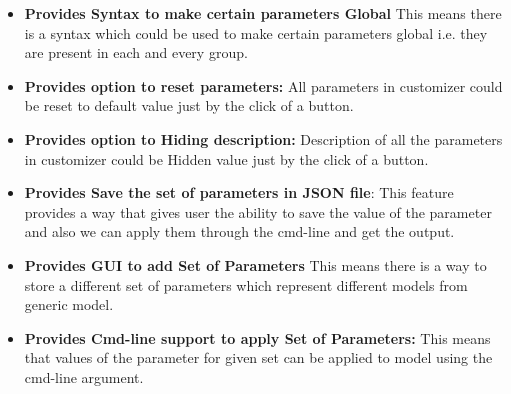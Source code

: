 \begin{itemize}
    \item \textbf{Provides Syntax to make certain parameters Global}
    This means there is a syntax which could be used to make certain parameters global i.e. they are present in each and every group.

    \item \textbf{Provides option to reset parameters:}
    All parameters in customizer could be reset to default value just by the click of a button.

    \item \textbf{Provides option to Hiding description:}
    Description of all the parameters in customizer could be Hidden value just by the click of a button.
   
    \item \textbf{Provides Save the set of parameters in JSON file}:
    This feature provides a way that gives user the ability to save the value of the parameter and also we can apply them through the cmd-line and get the output.
   
    \item \textbf{Provides GUI to add Set of Parameters}
    This means there is a way to store a different set of parameters which represent different models from generic model.
   
    \item \textbf{Provides Cmd-line support to apply Set of Parameters:}
    This means that values of the parameter for given set can be applied to model using the cmd-line argument.
   
     
\end{itemize}

